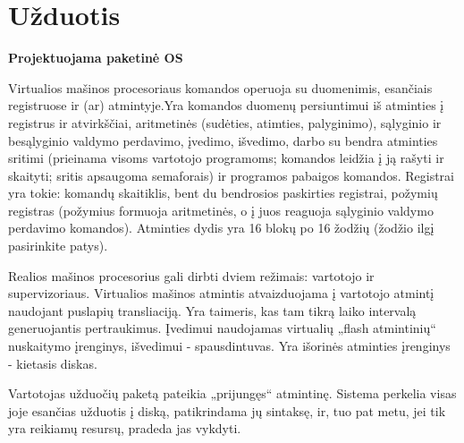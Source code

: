 \section{Užduotis}
\textbf{Projektuojama paketinė OS}

Virtualios mašinos procesoriaus komandos operuoja su duomenimis, esančiais registruose ir (ar) atmintyje.Yra komandos duomenų persiuntimui iš atminties į registrus ir atvirkščiai, aritmetinės (sudėties, atimties, palyginimo), sąlyginio ir besąlyginio valdymo perdavimo, įvedimo, išvedimo, darbo su bendra atminties sritimi (prieinama visoms vartotojo programoms; komandos leidžia į ją rašyti ir skaityti; sritis apsaugoma semaforais) ir programos pabaigos komandos. Registrai yra tokie: komandų skaitiklis, bent du bendrosios paskirties registrai, požymių registras (požymius formuoja aritmetinės, o į juos reaguoja sąlyginio valdymo perdavimo komandos). Atminties dydis yra 16 blokų po 16 žodžių (žodžio ilgį pasirinkite patys).

Realios mašinos procesorius gali dirbti dviem režimais: vartotojo ir supervizoriaus. Virtualios mašinos atmintis atvaizduojama į vartotojo atmintį naudojant puslapių transliaciją. Yra taimeris, kas tam tikrą laiko intervalą generuojantis pertraukimus. Įvedimui naudojamas virtualių „flash atmintinių“ nuskaitymo įrenginys, išvedimui - spausdintuvas. Yra išorinės atminties įrenginys - kietasis diskas.

Vartotojas užduočių paketą pateikia „prijungęs“ atmintinę. Sistema perkelia visas joje esančias užduotis į diską, patikrindama jų sintaksę, ir, tuo pat metu, jei tik yra reikiamų resursų, pradeda jas vykdyti.

\newpage

